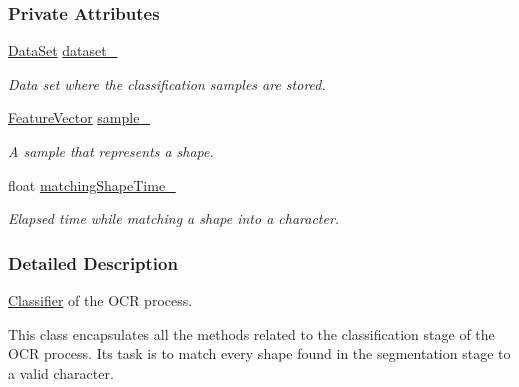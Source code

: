 \subsubsection*{Private Attributes}
\begin{CompactItemize}
\item 
\hypertarget{class_classifier_f51f1cad8043df12e5f0836fc3193cbf}{
\hyperlink{class_data_set}{DataSet} \hyperlink{class_classifier_f51f1cad8043df12e5f0836fc3193cbf}{dataset\_\-}}
\label{class_classifier_f51f1cad8043df12e5f0836fc3193cbf}

\begin{CompactList}\small\item\em Data set where the classification samples are stored. \item\end{CompactList}\item 
\hypertarget{class_classifier_3d46e3d6546304f24db6d9402375988a}{
\hyperlink{class_feature_vector}{FeatureVector} \hyperlink{class_classifier_3d46e3d6546304f24db6d9402375988a}{sample\_\-}}
\label{class_classifier_3d46e3d6546304f24db6d9402375988a}

\begin{CompactList}\small\item\em A sample that represents a shape. \item\end{CompactList}\item 
\hypertarget{class_classifier_3404a15b2bd381782cce404b56a5fce7}{
float \hyperlink{class_classifier_3404a15b2bd381782cce404b56a5fce7}{matchingShapeTime\_\-}}
\label{class_classifier_3404a15b2bd381782cce404b56a5fce7}

\begin{CompactList}\small\item\em Elapsed time while matching a shape into a character. \item\end{CompactList}\end{CompactItemize}


\subsubsection{Detailed Description}
\hyperlink{class_classifier}{Classifier} of the OCR process. 

This class encapsulates all the methods related to the classification stage of the OCR process. Its task is to match every shape found in the segmentation stage to a valid character.

